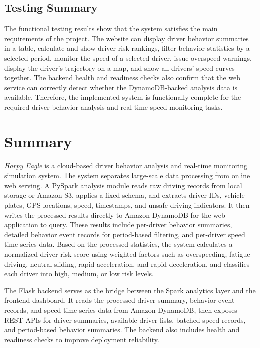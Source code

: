 \documentclass[12pt,a4paper]{article}
\begin{document}
\subsection{Testing Summary}

The functional testing results show that the system satisfies the main requirements of the project. The website can display driver behavior summaries in a table, calculate and show driver risk rankings, filter behavior statistics by a selected period, monitor the speed of a selected driver, issue overspeed warnings, display the driver's trajectory on a map, and show all drivers' speed curves together. The backend health and readiness checks also confirm that the web service can correctly detect whether the DynamoDB-backed analysis data is available. Therefore, the implemented system is functionally complete for the required driver behavior analysis and real-time speed monitoring tasks.

\section{Summary}

\textit{Harpy Eagle} is a cloud-based driver behavior analysis and real-time monitoring simulation system. The system separates large-scale data processing from online web serving. A PySpark analysis module reads raw driving records from local storage or Amazon S3, applies a fixed schema, and extracts driver IDs, vehicle plates, GPS locations, speed, timestamps, and unsafe-driving indicators. It then writes the processed results directly to Amazon DynamoDB for the web application to query. These results include per-driver behavior summaries, detailed behavior event records for period-based filtering, and per-driver speed time-series data. Based on the processed statistics, the system calculates a normalized driver risk score using weighted factors such as overspeeding, fatigue driving, neutral sliding, rapid acceleration, and rapid deceleration, and classifies each driver into high, medium, or low risk levels.

The Flask backend serves as the bridge between the Spark analytics layer and the frontend dashboard. It reads the processed driver summary, behavior event records, and speed time-series data from Amazon DynamoDB, then exposes REST APIs for driver summaries, available driver lists, batched speed records, and period-based behavior summaries. The backend also includes health and readiness checks to improve deployment reliability.
\end{document}
